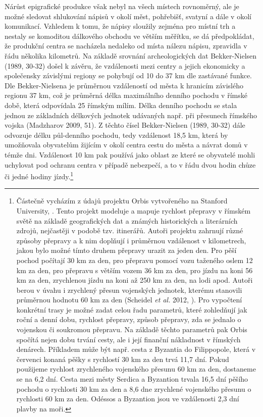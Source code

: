 Nárůst epigrafické produkce však nebyl na všech místech rovnoměrný, ale je možné sledovat shlukování nápisů v okolí měst, pohřebišť, svatyní a dále v okolí komunikací. Vzhledem k tomu, že nápisy sloužily zejména pro místní trh a nestaly se komoditou dálkového obchodu ve větším měřítku, se dá předpokládat, že produkční centra se nacházela nedaleko od místa nálezu nápisu, zpravidla v řádu několika kilometrů. Na základě srovnání archeologických dat Bekker-Nielsen (1989, 30-32) došel k závěru, že vzdálenosti mezi centry a jejich ekonomicky a společensky závislými regiony se pohybují od 10 do 37 km dle zastávané funkce. Dle Bekker-Nielsena je průměrnou vzdáleností od města k hranicím závislého regionu 37 km, což je průměrná délka maximálního denního pochodu v římské době, která odpovídala 25 římským mílím. Délka denního pochodu se stala jednou ze základních délkových jednotek udávaných např. při přesunech římského vojska (Madzharov 2009, 51). Z těchto čísel Bekker-Nielsen (1989, 30-32) dále odvozuje délku půl-denního pochodu, tedy vzdálenost 18,5 km, která by umožňovala obyvatelům žijícím v okolí centra cestu do města a návrat domů v témže dni. Vzdálenost 10 km pak používá jako oblast ze které se obyvatelé mohli uchylovat pod ochranu centra v případě nebezpečí, a to v řádu dvou hodin chůze či jedné hodiny jízdy.\footnote{Částečně vycházím z údajů projektu Orbis vytvořeného na Stanford University, \from[url23]. Tento projekt modeluje a mapuje rychlost přepravy v římském světě na základě geografických dat a známých historických a literárních zdrojů, nejčastěji v podobě tzv. itinerářů. Autoři projektu zahrnují různé způsoby přepravy a k nim doplňují i průměrnou vzdálenost v kilometrech, jakou bylo možné tímto druhem přepravy urazit za jeden den. Pro pěší pochod počítají 30 km za den, pro přepravu pomocí vozu taženého oslem 12 km za den, pro přepravu s větším vozem 36 km za den, pro jízdu na koni 56 km za den, zrychlenou jízdu na koni až 250 km za den, na lodi apod. Autoři berou v úvahu i zrychlený přesun vojenských jednotek, kterému stanovili průměrnou hodnotu 60 km za den (Scheidel {\em et al.} 2012, \from[url24]). Pro vypočtení konkrétní trasy je možné zadat celou řadu parametrů, které zohledňují jak roční a denní dobu, rychlost přepravy, způsob přepravy, zda se jednalo o vojenskou či soukromou přepravu. Na základě těchto parametrů pak Orbis spočítá nejen dobu trvání cesty, ale i její finanční nákladnost v římských denárech. Příkladem může být např. cesta z Byzantia do Filippopole, která v červenci konaná pěšky s rychlostí 30 km za den trvá 11,7 dní. Pokud použijeme rychlost zrychleného vojenského přesunu 60 km za den, dostaneme se na 6,2 dní. Cesta mezi městy Serdica a Byzantion trvala 16,5 dní pěšího pochodu o rychlosti 30 km za den a 8,6 dne zrychlené vojenského přesunu o rychlosti 60 km za den. Odéssos a Byzantion jsou ve vzdálenosti 2,3 dní plavby na moři.}

